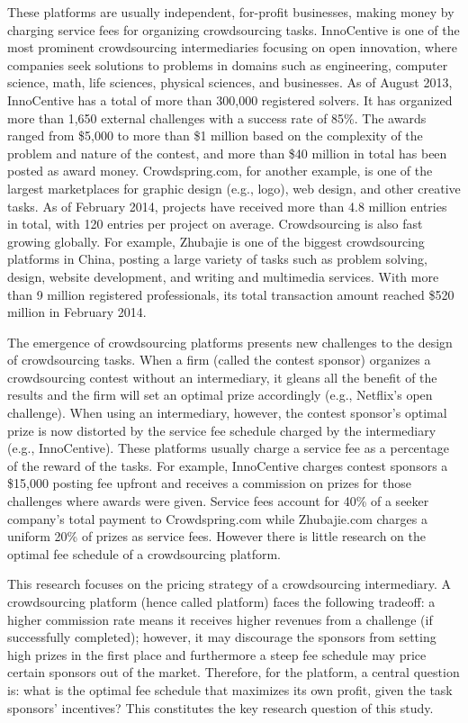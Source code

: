\documentclass[12pt]{article}
\begin{document}
These platforms are usually independent, for-profit businesses, making
money by charging service fees for organizing crowdsourcing tasks.
InnoCentive is one of the most prominent crowdsourcing intermediaries
focusing on open innovation, where companies seek solutions to problems
in domains such as engineering, computer science, math, life sciences,
physical sciences, and businesses. As of August 2013, InnoCentive
has a total of more than 300,000 registered solvers. It has organized
more than 1,650 external challenges with a success rate of 85\%. The
awards ranged from \$5,000 to more than \$1 million based on the complexity
of the problem and nature of the contest, and more than \$40 million
in total has been posted as award money. Crowdspring.com, for another
example, is one of the largest marketplaces for graphic design (e.g.,
logo), web design, and other creative tasks. As of February 2014,
projects have received more than 4.8 million entries in total, with
120 entries per project on average. Crowdsourcing is also fast growing
globally. For example, Zhubajie is one of the biggest crowdsourcing
platforms in China, posting a large variety of tasks such as problem
solving, design, website development, and writing and multimedia services.
With more than 9 million registered professionals, its total transaction
amount reached \$520 million in February 2014.

The emergence of crowdsourcing platforms presents new challenges to
the design of crowdsourcing tasks. When a firm (called the contest
sponsor) organizes a crowdsourcing contest without an intermediary,
it gleans all the benefit of the results and the firm will set an
optimal prize accordingly (e.g., Netflix's open challenge). When using
an intermediary, however, the contest sponsor's optimal prize is now
distorted by the service fee schedule charged by the intermediary
(e.g., InnoCentive). These platforms usually charge a service fee
as a percentage of the reward of the tasks. For example, InnoCentive
charges contest sponsors a \$15,000 posting fee upfront and receives
a commission on prizes for those challenges where awards were given.
Service fees account for 40\% of a seeker company's total payment
to Crowdspring.com while Zhubajie.com charges a uniform 20\% of prizes
as service fees. However there is little research on the optimal fee
schedule of a crowdsourcing platform.

This research focuses on the pricing strategy of a crowdsourcing intermediary.
A crowdsourcing platform (hence called platform) faces the following
tradeoff: a higher commission rate means it receives higher revenues
from a challenge (if successfully completed); however, it may discourage
the sponsors from setting high prizes in the first place and furthermore
a steep fee schedule may price certain sponsors out of the market.
Therefore, for the platform, a central question is: what is the
optimal fee schedule that maximizes its own profit, given the task
sponsors' incentives? This constitutes the key research question of
this study.
\end{document}
